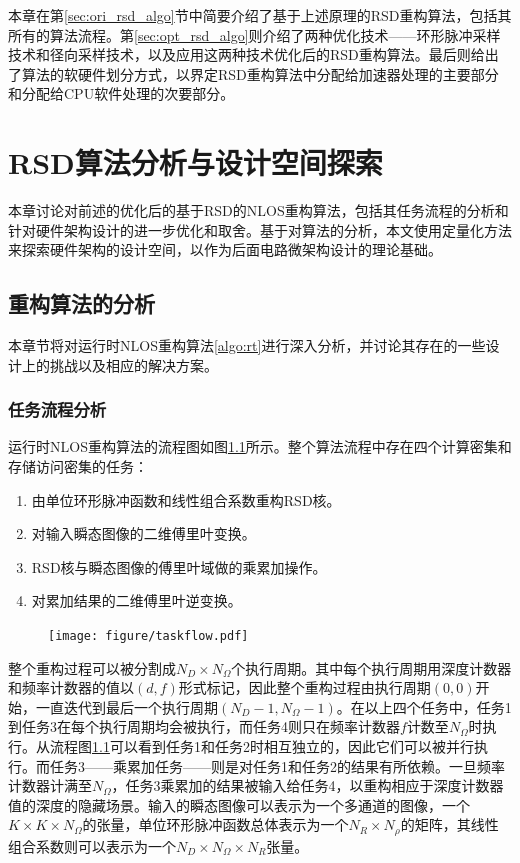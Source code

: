 \documentclass[master]{shtthesis}             %
\begin{document}
本章在第\ref{sec:ori_rsd_algo}节中简要介绍了基于上述原理的RSD重构算法，包括其所有的算法流程。第\ref{sec:opt_rsd_algo}则介绍了两种优化技术——环形脉冲采样技术和径向采样技术，以及应用这两种技术优化后的RSD重构算法。最后则给出了算法的软硬件划分方式，以界定RSD重构算法中分配给加速器处理的主要部分和分配给CPU软件处理的次要部分。

\chapter{RSD算法分析与设计空间探索}
本章讨论对前述的优化后的基于RSD的NLOS重构算法，包括其任务流程的分析和针对硬件架构设计的进一步优化和取舍。基于对算法的分析，本文使用定量化方法来探索硬件架构的设计空间，以作为后面电路微架构设计的理论基础。

\section{重构算法的分析} \label{sec:algo_analysis}
本章节将对运行时NLOS重构算法\ref{algo:rt}进行深入分析，并讨论其存在的一些设计上的挑战以及相应的解决方案。

\subsection{任务流程分析}
运行时NLOS重构算法的流程图如图\ref{fig:tsk_flow}所示。整个算法流程中存在四个计算密集和存储访问密集的任务：
\begin{enumerate}
  \item 由单位环形脉冲函数和线性组合系数重构RSD核。
  \item 对输入瞬态图像的二维傅里叶变换。
  \item RSD核与瞬态图像的傅里叶域做的乘累加操作。
  \item 对累加结果的二维傅里叶逆变换。
\end{enumerate}
\begin{figure}[!tb]
    \centering
    \texttt{[image: figure/taskflow.pdf]}
    \label{fig:tsk_flow}
\end{figure}

整个重构过程可以被分割成$N_D\times N_\Omega$个执行周期。其中每个执行周期用深度计数器和频率计数器的值以$(d,f)$形式标记，因此整个重构过程由执行周期$(0,0)$开始，一直迭代到最后一个执行周期$(N_D-1,N_\Omega-1)$。在以上四个任务中，任务1到任务3在每个执行周期均会被执行，而任务4则只在频率计数器$f$计数至$N_\Omega$时执行。从流程图\ref{fig:tsk_flow}可以看到任务1和任务2时相互独立的，因此它们可以被并行执行。而任务3——乘累加任务——则是对任务1和任务2的结果有所依赖。一旦频率计数器计满至$N_\Omega$，任务3乘累加的结果被输入给任务4，以重构相应于深度计数器值的深度的隐藏场景。输入的瞬态图像可以表示为一个多通道的图像，一个$K\times K\times N_\Omega$的张量，单位环形脉冲函数总体表示为一个$N_R\times N_\rho$的矩阵，其线性组合系数则可以表示为一个$N_D\times N_\Omega\times N_R$张量。
\end{document}
